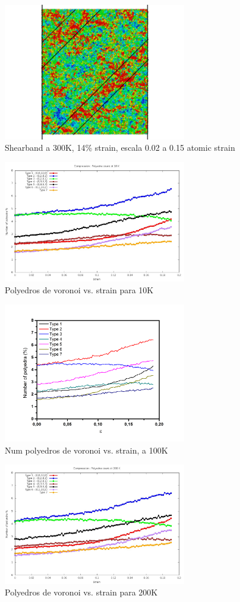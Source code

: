 \documentclass[10pt, oneside]{article} %
\begin{document}
\begin{figure}[H]
\centering
\includegraphics[width=8cm]{Figures/ShearBand.png}
\caption{Shearband a 300K, 14\% strain, escala 0.02 a 0.15 atomic strain}
\end{figure}

\begin{figure}[H]
\centering
\includegraphics[width=8cm]{Figures/Compr_Polyedra_10K.jpeg}
\caption{Polyedros de voronoi vs. strain para 10K}
\end{figure}

\begin{figure}[H]
\centering
\includegraphics[width=8cm]{Figures/Polyedra_Vs_Strain_100K_COMP.png}
\caption{Num polyedros de voronoi vs. strain, a 100K}
\end{figure}

\begin{figure}[H]
\centering
\includegraphics[width=8cm]{Figures/Compr_Polyedra_200K.jpeg}
\caption{Polyedros de voronoi vs. strain para 200K}
\end{figure}
\end{document}
